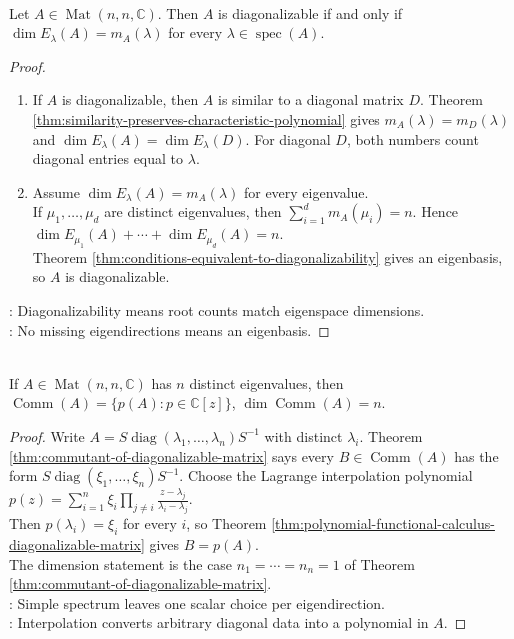 \begin{theorem} \label{thm:diagonalizable-iff-algebraic-geometric-multiplicities-match} \\
Let $A\in\operatorname{Mat}(n,n,\mathbb{C})$. Then $A$ is diagonalizable if and only if $\dim E_{\lambda}(A)=m_A(\lambda)$ for every $\lambda\in\operatorname{spec}(A)$.
\begin{proof}
\begin{enumerate}[label=\roman*.]
\setlength{\itemsep}{0pt}
\item[$(\Rightarrow)$] If $A$ is diagonalizable, then $A$ is similar to a diagonal matrix $D$. Theorem \ref{thm:similarity-preserves-characteristic-polynomial} gives $m_A(\lambda)=m_D(\lambda)$ and $\dim E_{\lambda}(A)=\dim E_{\lambda}(D)$. For diagonal $D$, both numbers count diagonal entries equal to $\lambda$.
\item[$(\Leftarrow)$] Assume $\dim E_{\lambda}(A)=m_A(\lambda)$ for every eigenvalue.\\
If $\mu_1,\ldots,\mu_d$ are distinct eigenvalues, then $\sum\limits_{i=1}^{d}m_A(\mu_i)=n$. Hence $\dim E_{\mu_1}(A)+\cdots+\dim E_{\mu_d}(A)=n$.\\
Theorem \ref{thm:conditions-equivalent-to-diagonalizability} gives an eigenbasis, so $A$ is diagonalizable.
\end{enumerate}
: Diagonalizability means root counts match eigenspace dimensions.\\
: No missing eigendirections means an eigenbasis.
\end{proof}
\end{theorem}

\begin{corollary} \label{cor:commutant-distinct-eigenvalues-polynomials} \\
If $A\in\operatorname{Mat}(n,n,\mathbb{C})$ has $n$ distinct eigenvalues, then $\operatorname{Comm}(A)=\{p(A):p\in\mathbb{C}[z]\}$, $\dim\operatorname{Comm}(A)=n$.
\begin{proof}
Write $A=S\operatorname{diag}(\lambda_1,\ldots,\lambda_n)S^{-1}$ with distinct $\lambda_i$. Theorem \ref{thm:commutant-of-diagonalizable-matrix} says every $B\in\operatorname{Comm}(A)$ has the form $S\operatorname{diag}(\xi_1,\ldots,\xi_n)S^{-1}$. Choose the Lagrange interpolation polynomial $p(z)=\sum\limits_{i=1}^{n}\xi_i\prod\limits_{j\neq i}\frac{z-\lambda_j}{\lambda_i-\lambda_j}$.\\
Then $p(\lambda_i)=\xi_i$ for every $i$, so Theorem \ref{thm:polynomial-functional-calculus-diagonalizable-matrix} gives $B=p(A)$.\\
The dimension statement is the case $n_1=\cdots=n_n=1$ of Theorem \ref{thm:commutant-of-diagonalizable-matrix}.\\
: Simple spectrum leaves one scalar choice per eigendirection.\\
: Interpolation converts arbitrary diagonal data into a polynomial in $A$.
\end{proof}
\end{corollary}

